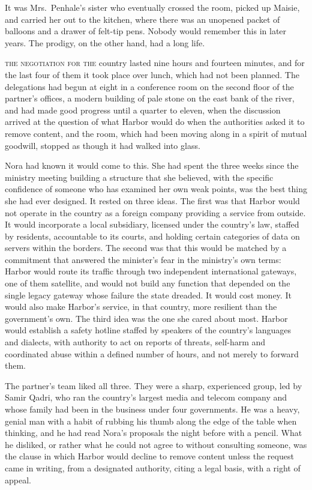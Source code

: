It was Mrs.~Penhale's sister who eventually crossed the room, picked up Maisie, and carried her out to the kitchen, where there was an unopened packet of balloons and a drawer of felt-tip pens. Nobody would remember this in later years. The prodigy, on the other hand, had a long life.


\textsc{the negotiation for the} country lasted nine hours and fourteen minutes, and for the last four of them it took place over lunch, which had not been planned. The delegations had begun at eight in a conference room on the second floor of the partner's offices, a modern building of pale stone on the east bank of the river, and had made good progress until a quarter to eleven, when the discussion arrived at the question of what Harbor would do when the authorities asked it to remove content, and the room, which had been moving along in a spirit of mutual goodwill, stopped as though it had walked into glass.

Nora had known it would come to this. She had spent the three weeks since the ministry meeting building a structure that she believed, with the specific confidence of someone who has examined her own weak points, was the best thing she had ever designed. It rested on three ideas. The first was that Harbor would not operate in the country as a foreign company providing a service from outside. It would incorporate a local subsidiary, licensed under the country's law, staffed by residents, accountable to its courts, and holding certain categories of data on servers within the borders. The second was that this would be matched by a commitment that answered the minister's fear in the ministry's own terms: Harbor would route its traffic through two independent international gateways, one of them satellite, and would not build any function that depended on the single legacy gateway whose failure the state dreaded. It would cost money. It would also make Harbor's service, in that country, more resilient than the government's own. The third idea was the one she cared about most. Harbor would establish a safety hotline staffed by speakers of the country's languages and dialects, with authority to act on reports of threats, self-harm and coordinated abuse within a defined number of hours, and not merely to forward them.

The partner's team liked all three. They were a sharp, experienced group, led by Samir Qadri, who ran the country's largest media and telecom company and whose family had been in the business under four governments. He was a heavy, genial man with a habit of rubbing his thumb along the edge of the table when thinking, and he had read Nora's proposals the night before with a pencil. What he disliked, or rather what he could not agree to without consulting someone, was the clause in which Harbor would decline to remove content unless the request came in writing, from a designated authority, citing a legal basis, with a right of appeal.

